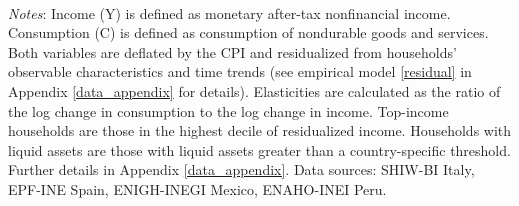 \documentclass[12pt]{article}
\begin{document}
\begin{spacing}{1.5}
\begin{table}[H]
\begin{centering}
\caption{Consumption-income Elasticities: Average and Top-income Households
{\label{tab_elasticities_incomedecile_residualized}}}
\vspace*{-0.2em}
  \\

\par\end{centering}
\medskip{}

\raggedright{}\textit{\footnotesize{}Notes}{\footnotesize{}: Income (Y) is defined as monetary after-tax nonfinancial income. Consumption (C) is defined as consumption of nondurable goods and services. Both variables are deflated by the CPI and residualized from households' observable characteristics and time trends (see empirical model \eqref{residual} in Appendix \ref{data_appendix} for details). Elasticities are calculated as the ratio of the log change in consumption to the log change in income. Top-income households are those in the highest decile of residualized income. Households with liquid assets are those with liquid assets greater than a country-specific threshold. Further details in Appendix \ref{data_appendix}. Data sources:  SHIW-BI Italy, EPF-INE Spain, ENIGH-INEGI Mexico, ENAHO-INEI Peru. }{\footnotesize\par}


\end{table}
\end{spacing}
\end{document}
